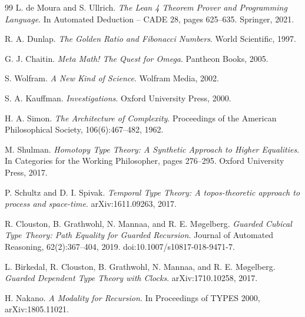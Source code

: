 \documentclass[11pt]{article}
\theoremstyle{definition}
\theoremstyle{plain}
\theoremstyle{remark}
\begin{document}
\begin{thebibliography}{99}
L. de Moura and S. Ullrich.
\textit{The Lean 4 Theorem Prover and Programming Language}.
In Automated Deduction -- CADE 28, pages 625--635. Springer, 2021.

R. A. Dunlap.
\textit{The Golden Ratio and Fibonacci Numbers}.
World Scientific, 1997.

G. J. Chaitin.
\textit{Meta Math! The Quest for Omega}.
Pantheon Books, 2005.

S. Wolfram.
\textit{A New Kind of Science}.
Wolfram Media, 2002.

S. A. Kauffman.
\textit{Investigations}.
Oxford University Press, 2000.

H. A. Simon.
\textit{The Architecture of Complexity}.
Proceedings of the American Philosophical Society, 106(6):467--482, 1962.

M. Shulman.
\textit{Homotopy Type Theory: A Synthetic Approach to Higher Equalities}.
In Categories for the Working Philosopher, pages 276--295. Oxford University Press, 2017.

P. Schultz and D. I. Spivak.
\textit{Temporal Type Theory: A topos-theoretic approach to process and space-time}.
arXiv:1611.09263, 2017.

R. Clouston, B. Grathwohl, N. Mannaa, and R. E. Møgelberg.
\textit{Guarded Cubical Type Theory: Path Equality for Guarded Recursion}.
Journal of Automated Reasoning, 62(2):367--404, 2019. doi:10.1007/s10817-018-9471-7.

L. Birkedal, R. Clouston, B. Grathwohl, N. Mannaa, and R. E. Møgelberg.
\textit{Guarded Dependent Type Theory with Clocks}.
arXiv:1710.10258, 2017.

H. Nakano.
\textit{A Modality for Recursion}.
In Proceedings of TYPES 2000, arXiv:1805.11021.

\end{thebibliography}
\end{document}
